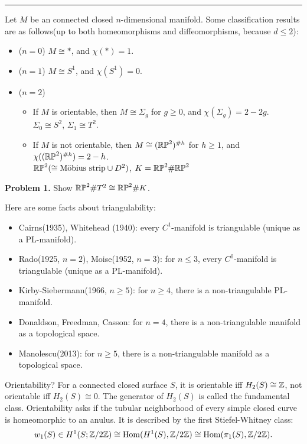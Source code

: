 \documentclass{../../small}
\begin{document}
\smallskip\hrule\bigskip

Let $M$ be an connected closed $n$-dimensional manifold.
Some classification results are as follows(up to both homeomorphisms and diffeomorphisms, because $d\le2$):
\begin{itemize}
\item ($n=0$) $M\cong *$, and $\chi(*)=1$.
\item ($n=1$) $M\cong S^1$, and $\chi(S^1)=0$.
\item ($n=2$)
	\begin{itemize}
	\item If $M$ is orientable, then $M\cong\Sigma_g$ for $g\ge0$, and $\chi(\Sigma_g)=2-2g$.\\
	$\Sigma_0\cong S^2$, $\Sigma_1\cong T^2$.
	\item If $M$ is not orientable, then $M\cong(\mathbb{RP}^2)^{\# h}$ for $h\ge1$, and $\chi((\mathbb{RP}^2)^{\#h})=2-h$.\\
	$\mathbb{RP}^2(\cong\text{M\"obius strip}\cup D^2)$, $K=\mathbb{RP}^2\#\mathbb{RP}^2$
	\end{itemize}
\end{itemize}

\textbf{Problem 1.} Show $\mathbb{RP}^2\#T^2\cong\mathbb{RP}^2\#K$.
\bigskip

Here are some facts about triangulability:
\begin{itemize}
\item Cairns(1935), Whitehead (1940): every $C^1$-manifold is triangulable (unique as a PL-manifold).
\item Rado(1925, $n=2$), Moise(1952, $n=3$): for $n\le3$, every $C^0$-manifold is triangulable (unique as a PL-manifold).
\item Kirby-Siebermann(1966, $n\ge5$): for $n\ge4$, there is a non-triangulable PL-manifold.
\item Donaldson, Freedman, Casson: for $n=4$, there is a non-triangulable manifold as a topological space.
\item Manolescu(2013): for $n\ge5$, there is a non-triangulable manifold as a topological space.
\end{itemize}

Orientability?
For a connected closed surface $S$, it is orientable iff $H_2(S)\cong\mathbb{Z}$, not orientable iff $H_2(S)\cong0$. The generator of $H_2(S)$ is called the fundamental class.
Orientability asks if the tubular neighborhood of every simple closed curve is homeomorphic to an anulus.
It is described by the first Stiefel-Whitney class:
\[w_1(S)\in H^1(S;\mathbb{Z}/2\mathbb{Z})\cong\operatorname{Hom}(H^1(S),\mathbb{Z}/2\mathbb{Z})\cong\operatorname{Hom}(\pi_1(S),\mathbb{Z}/2\mathbb{Z}).\]
\end{document}
